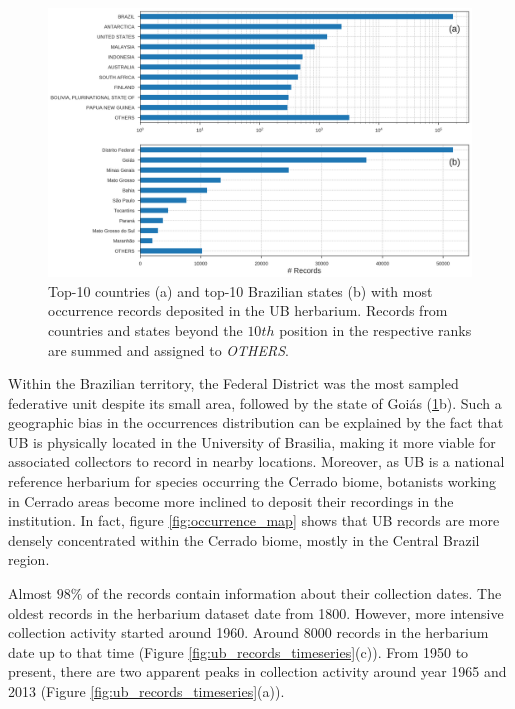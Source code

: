   \begin{figure}[!htb]
  	\centering
    \includegraphics[width=\linewidth]{figures/recs_by_cntry_state.png}
    \caption{Top-10 countries (a) and top-10 Brazilian states (b) with most occurrence records deposited in the UB herbarium. Records from countries and states beyond the $10th$ position in the respective ranks are summed and assigned to \textit{OTHERS}.}
    \label{fig:recs_by_cntry_state}
  \end{figure}
  
Within the Brazilian territory, the Federal District was the most sampled federative unit despite its small area, followed by the state of Goiás (\ref{fig:recs_by_cntry_state}b). 
Such a geographic bias in the occurrences distribution can be explained by the fact that UB is physically located in the University of Brasilia, making it more viable for associated collectors to record in nearby locations.
Moreover, as UB is a national reference herbarium for species occurring the Cerrado biome, botanists working in Cerrado areas become more inclined to deposit their recordings in the institution.
In fact, figure \ref{fig:occurrence_map} shows that UB records are more densely concentrated within the Cerrado biome, mostly in the Central Brazil region. 


  
Almost $98\%$ of the records contain information about their collection dates.
The oldest records in the herbarium dataset date from 1800.
However, more intensive collection activity started around 1960. Around 8000 records in the herbarium date up to that time (Figure \ref{fig:ub_records_timeseries}(c)). 
From 1950 to present, there are two apparent peaks in collection activity around year 1965 and 2013 (Figure \ref{fig:ub_records_timeseries}(a)). %

